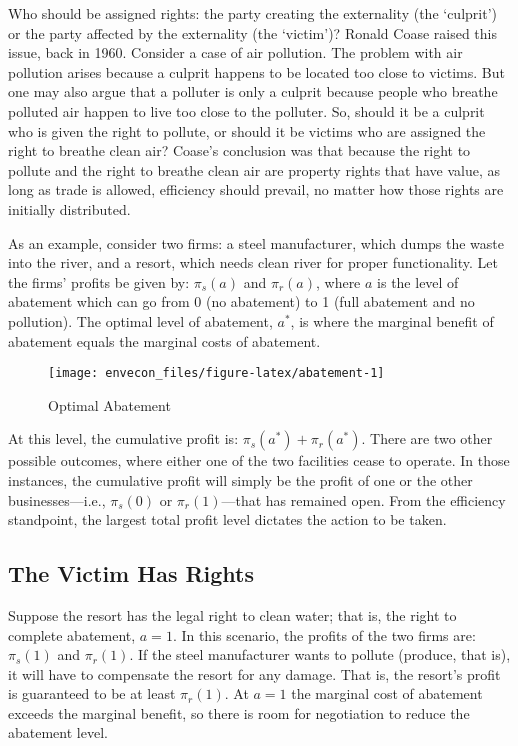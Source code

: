 \documentclass[
]{book}
\begin{document}
Who should be assigned rights: the party creating the externality (the `culprit') or the party affected by the externality (the `victim')? Ronald Coase raised this issue, back in 1960. Consider a case of air pollution. The problem with air pollution arises because a culprit happens to be located too close to victims. But one may also argue that a polluter is only a culprit because people who breathe polluted air happen to live too close to the polluter. So, should it be a culprit who is given the right to pollute, or should it be victims who are assigned the right to breathe clean air? Coase's conclusion was that because the right to pollute and the right to breathe clean air are property rights that have value, as long as trade is allowed, efficiency should prevail, no matter how those rights are initially distributed.

As an example, consider two firms: a steel manufacturer, which dumps the waste into the river, and a resort, which needs clean river for proper functionality. Let the firms' profits be given by: \(\pi_s(a)\) and \(\pi_r(a)\), where \(a\) is the level of abatement which can go from 0 (no abatement) to 1 (full abatement and no pollution). The optimal level of abatement, \(a^*\), is where the marginal benefit of abatement equals the marginal costs of abatement.

\begin{figure}

{\centering \texttt{[image: envecon\_files/figure-latex/abatement-1]} 

}

\caption{Optimal Abatement}\label{fig:abatement}
\end{figure}

At this level, the cumulative profit is: \(\pi_s(a^*)+\pi_r(a^*)\). There are two other possible outcomes, where either one of the two facilities cease to operate. In those instances, the cumulative profit will simply be the profit of one or the other businesses---i.e., \(\pi_s(0)\) or \(\pi_r(1)\)---that has remained open. From the efficiency standpoint, the largest total profit level dictates the action to be taken.

\hypertarget{the-victim-has-rights}{%
\subsection{The Victim Has Rights}\label{the-victim-has-rights}}

Suppose the resort has the legal right to clean water; that is, the right to complete abatement, \(a=1\). In this scenario, the profits of the two firms are: \(\pi_s(1)\) and \(\pi_r(1)\). If the steel manufacturer wants to pollute (produce, that is), it will have to compensate the resort for any damage. That is, the resort's profit is guaranteed to be at least \(\pi_r(1)\). At \(a=1\) the marginal cost of abatement exceeds the marginal benefit, so there is room for negotiation to reduce the abatement level.
\end{document}
